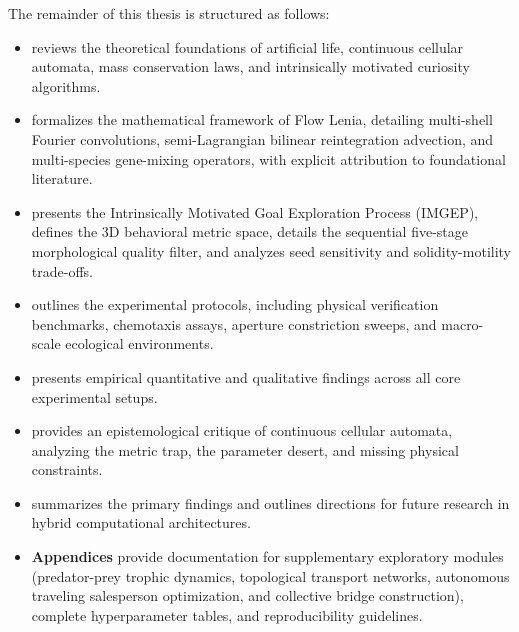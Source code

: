 The remainder of this thesis is structured as follows:
\begin{itemize}
    \item \textbf{} reviews the theoretical foundations of artificial life, continuous cellular automata, mass conservation laws, and intrinsically motivated curiosity algorithms.
    \item \textbf{} formalizes the mathematical framework of Flow Lenia, detailing multi-shell Fourier convolutions, semi-Lagrangian bilinear reintegration advection, and multi-species gene-mixing operators, with explicit attribution to foundational literature.
    \item \textbf{} presents the Intrinsically Motivated Goal Exploration Process (IMGEP), defines the 3D behavioral metric space, details the sequential five-stage morphological quality filter, and analyzes seed sensitivity and solidity-motility trade-offs.
    \item \textbf{} outlines the experimental protocols, including physical verification benchmarks, chemotaxis assays, aperture constriction sweeps, and macro-scale ecological environments.
    \item \textbf{} presents empirical quantitative and qualitative findings across all core experimental setups.
    \item \textbf{} provides an epistemological critique of continuous cellular automata, analyzing the metric trap, the parameter desert, and missing physical constraints.
    \item \textbf{} summarizes the primary findings and outlines directions for future research in hybrid computational architectures.
    \item \textbf{Appendices} provide documentation for supplementary exploratory modules (predator-prey trophic dynamics, topological transport networks, autonomous traveling salesperson optimization, and collective bridge construction), complete hyperparameter tables, and reproducibility guidelines.
\end{itemize}